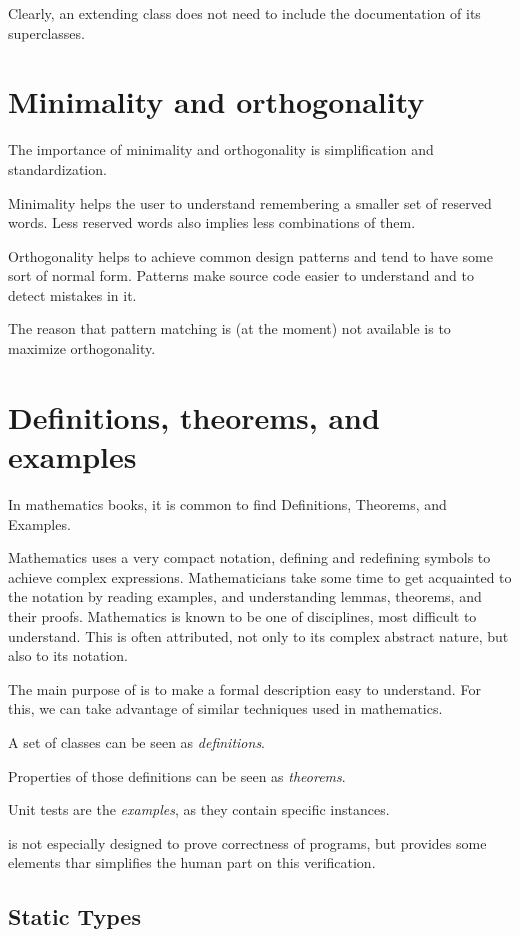 Clearly, an extending class does not need to include the documentation of its superclasses.


\section{Minimality and orthogonality}

The importance of minimality and orthogonality is simplification and standardization.

Minimality helps the user to understand remembering a smaller set of reserved words.
Less reserved words also implies less combinations of them.

Orthogonality helps to achieve common design patterns and tend to have some sort of normal form.
Patterns make source code easier to understand and to detect mistakes in it.

The reason that pattern matching is (at the moment) not available is to maximize orthogonality.


\section{Definitions, theorems, and examples}

In mathematics books, it is common to find Definitions, Theorems, and Examples.

Mathematics uses a very compact notation, defining and redefining symbols to achieve complex expressions.
Mathematicians take some time to get acquainted to the notation by reading examples, and understanding lemmas, theorems, and their proofs.
Mathematics is known to be one of disciplines, most difficult to understand.
This is often attributed, not only to its complex abstract nature, but also to its notation.

The main purpose of \Soda is to make a formal description easy to understand.
For this, we can take advantage of similar techniques used in mathematics.

A set of \Soda classes can be seen as \textit{definitions}.

Properties of those definitions can be seen as \textit{theorems}.

Unit tests are the \textit{examples}, as they contain specific instances.

\Soda is not especially designed to prove correctness of programs, but provides some elements thar simplifies the human part on this verification.

\subsection{Static Types}

